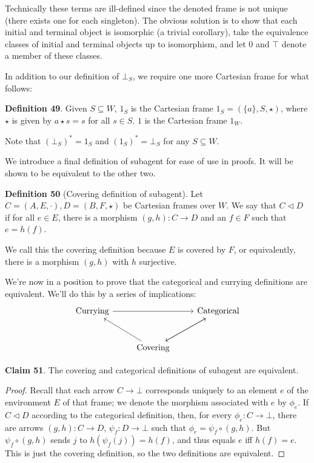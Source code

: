 \documentclass{article}
\begin{document}
\noindent Technically these terms are ill-defined since the denoted frame is not unique (there exists one for each singleton).
The obvious solution is to show that each initial and terminal object is isomorphic (a trivial corollary), take the equivalence classes of initial and terminal objects up to isomorphism, and let $0$ and $\top$ denote a member of these classes.

In addition to our definition of $\bot_S$, we require one more Cartesian frame for what follows:


\bigskip
\noindent \textbf{Definition 49}.
Given $S \subseteq W$, $1_S$ is the Cartesian frame $1_S = (\{a\}, S, \star)$, where $\star$ is given by $a \star s = s$ for all $s \in S$.
$1$ is the Cartesian frame $1_W$.

\bigskip
\noindent Note that $(\bot_S)^* = 1_S$ and $(1_S)^* = \bot_S$ for any $S \subseteq W$.

We introduce a final definition of subagent for ease of use in proofs.
It will be shown to be equivalent to the other two.

\bigskip
\noindent \textbf{Definition 50} (Covering definition of subagent).
Let $C = (A, E, \cdot), D = (B, F, \star)$ be Cartesian frames over $W$.
We say that $C \triangleleft D$ if for all $e \in E$, there is a morphism $(g, h) : C \to D$ and an $f \in F$ such that $e = h(f)$.

\noindent We call this the covering definition because $E$ is covered by $F$, or equivalently, there is a morphism $(g, h)$ with $h$ surjective.

We're now in a position to prove that the categorical and currying definitions are equivalent.
We'll do this by a series of implications:
\[\begin{tikzcd}[row sep=large]
	{\text{Currying}} && {\text{Categorical}} \\
	& {\text{Covering}}
	\arrow[from=2-2, to=1-1]
	\arrow[from=1-1, to=1-3]
	\arrow[from=1-3, to=2-2]
	\arrow[from=2-2, to=1-3]
\end{tikzcd}\]

\bigskip
\noindent \textbf{Claim 51}.
The covering and categorical definitions of subagent are equivalent.

\begin{proof}
Recall that each arrow $C \to \bot$ corresponds uniquely to an element $e$ of the environment $E$ of that frame; we denote the morphism associated with $e$ by $\phi_e$.
If $C \triangleleft D$ according to the categorical definition, then, for every $\phi_e: C \to \bot$, there are arrows $(g, h) : C \to D$, $\psi_f : D \to \bot$ such that $\phi_e = \psi_f \circ (g, h)$.
But $\psi_f \circ (g, h)$ sends $j$ to $h(\psi_f(j)) = h(f)$, and thus equals $e$ iff $h(f) = e$.
This is just the covering definition, so the two definitions are equivalent.
\end{proof}
\end{document}
